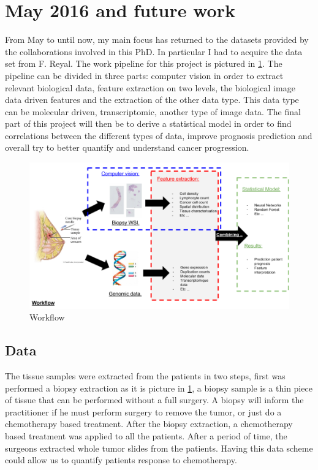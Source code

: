 \documentclass[a4paper,10pt]{article}
\begin{document}
\section{May 2016 and future work}
From May to until now, my main focus has returned to the datasets provided by the collaborations involved in this PhD. In particular I had to acquire the data set from F. Reyal. The work pipeline for this project is pictured in \ref{workflow1}. The pipeline can be divided in three parts: computer vision in order to extract relevant biological data, feature extraction on two levels, the biological image data driven features and the extraction of the other data type. This data type can be molecular driven, transcriptomic, another type of image data. The final part of this project will then be to derive a statistical model in order to find correlations between the different types of data, improve prognosis prediction and overall try to better quantify and understand cancer progression.

\begin{figure}[!ht]
\centering
\includegraphics[width=\textwidth]{Workflow.png}
\caption{Workflow}
\label{workflow1}
\end{figure}


\subsection{Data}

The tissue samples were extracted from the patients in two steps, first was performed a biopsy extraction as it is picture in \ref{workflow1}, a biopsy sample is a thin piece of tissue that can be performed without a full surgery. A biopsy will inform the practitioner if he must perform surgery to remove the tumor, or just do a chemotherapy based treatment. After the biopsy extraction, a chemotherapy based treatment was applied to all the patients. After a period of time, the surgeons extracted whole tumor slides from the patients. Having this data scheme could allow us to quantify patients response to chemotherapy.
\end{document}
